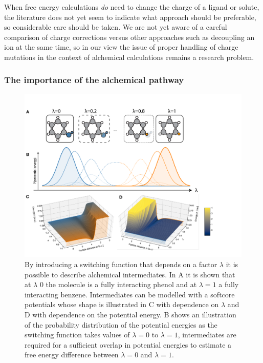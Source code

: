\documentclass[9pt,bestpractices]{livecoms}
\begin{document}
When free energy calculations \emph{do} need to change the charge of a ligand or solute, the literature does not yet seem to indicate what approach should be preferable, so considerable care should be taken.
We are not yet aware of a careful comparison of charge corrections versus other approaches such as decoupling an ion at the same time, so in our view the issue of proper handling of charge mutations in the context of alchemical calculations remains a research problem.

\subsubsection*{The importance of the alchemical pathway\label{sec:important_path}}

\begin{figure}
    \includegraphics[width=0.95\linewidth]{figures/fig7_what_is_lam/Figure.pdf}
    \caption{By introducing a switching function that depends on a factor $\lambda$ it is possible to describe alchemical intermediates. In A it is shown that at $\lambda$ 0 the molecule is a fully interacting phenol and at $\lambda=1$ a fully interacting benzene. Intermediates can be modelled with a softcore potentials whose shape is illustrated in C with dependence on $\lambda$ and D with dependence on the potential energy. B shows an illustration of the probability distribution of the potential energies as the switching function takes values of $\lambda=0$ to $\lambda=1$, intermediates are required for a sufficient overlap in potential energies to estimate a free energy difference between $\lambda=0$ and $\lambda=1$. }
    \label{fig:fig_what_is_lambda}
\end{figure}
\end{document}
